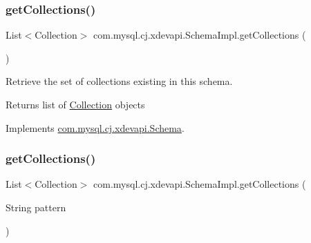 \mbox{\label{classcom_1_1mysql_1_1cj_1_1xdevapi_1_1_schema_impl_a67c63b711c361bf306149d53d1149e61}} 
\subsubsection{\texorpdfstring{get\+Collections()}{getCollections()}\hspace{0.1cm}{\footnotesize\ttfamily [1/2]}}
{\footnotesize\ttfamily List$<$Collection$>$ com.\+mysql.\+cj.\+xdevapi.\+Schema\+Impl.\+get\+Collections (\begin{DoxyParamCaption}{ }\end{DoxyParamCaption})}

Retrieve the set of collections existing in this schema.

\begin{DoxyReturn}{Returns}
list of \mbox{\hyperlink{interfacecom_1_1mysql_1_1cj_1_1xdevapi_1_1_collection}{Collection}} objects 
\end{DoxyReturn}


Implements \mbox{\hyperlink{interfacecom_1_1mysql_1_1cj_1_1xdevapi_1_1_schema_a644344cb0eaa8ea239f7b82443c487ec}{com.\+mysql.\+cj.\+xdevapi.\+Schema}}.

\mbox{\label{classcom_1_1mysql_1_1cj_1_1xdevapi_1_1_schema_impl_a9a4dc1d12f1d8240c4b6bc114565b191}} 
\subsubsection{\texorpdfstring{get\+Collections()}{getCollections()}\hspace{0.1cm}{\footnotesize\ttfamily [2/2]}}
{\footnotesize\ttfamily List$<$Collection$>$ com.\+mysql.\+cj.\+xdevapi.\+Schema\+Impl.\+get\+Collections (\begin{DoxyParamCaption}\item[{String}]{pattern }\end{DoxyParamCaption})}

